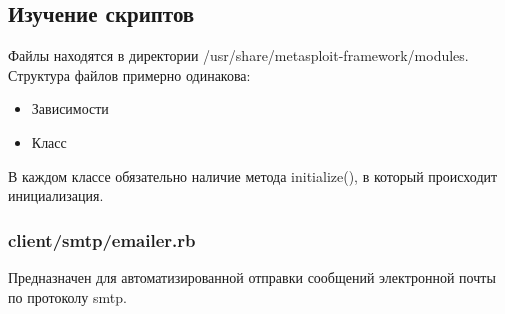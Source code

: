 \documentclass[10pt,a4paper]{report}
\begin{document}
\subsection{Изучение скриптов}

Файлы находятся в директории /usr/share/metasploit-framework/modules.
Структура файлов примерно одинакова:
\begin{itemize}
	\item{Зависимости}
	\item{Класс}
\end{itemize}
В каждом классе обязательно наличие метода initialize(), в который происходит инициализация.


\subsubsection{client/smtp/emailer.rb}

Предназначен для автоматизированной отправки сообщений электронной почты по протоколу smtp.
\end{document}
